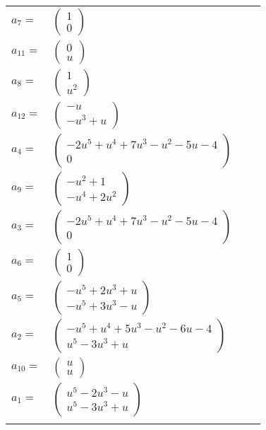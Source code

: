 \documentclass[1p]{elsarticle_modified}
\theoremstyle{definition}
\begin{document}
\begin{tabular}{m{7pt} m{180pt} m{7pt} m{180pt} }
\flushright $a_{7}=$&$\begin{pmatrix}1\\0\end{pmatrix}$ \\
\flushright $a_{11}=$&$\begin{pmatrix}0\\u\end{pmatrix}$ \\
\flushright $a_{8}=$&$\begin{pmatrix}1\\u^2\end{pmatrix}$ \\
\flushright $a_{12}=$&$\begin{pmatrix}- u\\- u^3+u\end{pmatrix}$ \\
\flushright $a_{4}=$&$\begin{pmatrix}-2 u^5+u^4+7 u^3- u^2-5 u-4\\0\end{pmatrix}$ \\
\flushright $a_{9}=$&$\begin{pmatrix}- u^2+1\\- u^4+2 u^2\end{pmatrix}$ \\
\flushright $a_{3}=$&$\begin{pmatrix}-2 u^5+u^4+7 u^3- u^2-5 u-4\\0\end{pmatrix}$ \\
\flushright $a_{6}=$&$\begin{pmatrix}1\\0\end{pmatrix}$ \\
\flushright $a_{5}=$&$\begin{pmatrix}- u^5+2 u^3+u\\- u^5+3 u^3- u\end{pmatrix}$ \\
\flushright $a_{2}=$&$\begin{pmatrix}- u^5+u^4+5 u^3- u^2-6 u-4\\u^5-3 u^3+u\end{pmatrix}$ \\
\flushright $a_{10}=$&$\begin{pmatrix}u\\u\end{pmatrix}$ \\
\flushright $a_{1}=$&$\begin{pmatrix}u^5-2 u^3- u\\u^5-3 u^3+u\end{pmatrix}$\\&\end{tabular}
\end{document}
